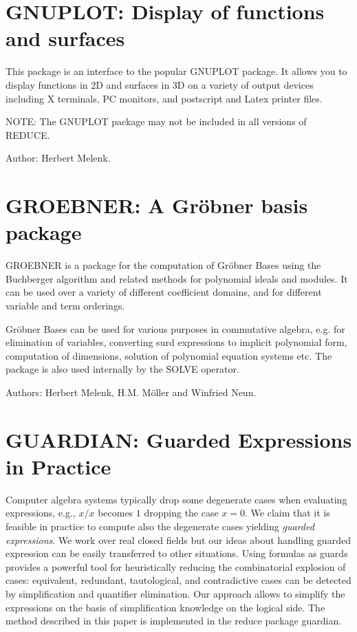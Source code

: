 \newpage

\section{GNUPLOT: Display of functions and surfaces}

This package is an interface to the popular GNUPLOT package.
It allows you to display functions in 2D and surfaces in 3D
on a variety of output devices including X terminals, PC monitors, and
postscript and Latex printer files.

NOTE: The GNUPLOT package may not be included in all versions of REDUCE.

Author: Herbert Melenk.


\newpage

\section{GROEBNER: A Gr\"obner basis package} 
\label{GROEBNER}

GROEBNER is a package for the computation of Gr\"obner
Bases using the Buchberger algorithm and related methods
for polynomial ideals and modules.  It can be used over a variety of
different coefficient domains, and for different variable and term
orderings.

Gr\"obner Bases can be used for various purposes in commutative
algebra, e.g. for elimination of variables,
converting surd expressions to implicit polynomial form,
computation of dimensions, solution of polynomial equation systems 
 etc. 
The package is also used internally by the \f{SOLVE}
operator.

Authors: Herbert Melenk, H.M. M\"oller and Winfried Neun.


\newpage

\section{GUARDIAN: Guarded Expressions in Practice}
\label{GUARDIAN}

Computer algebra systems typically drop some degenerate cases when
evaluating expressions, e.g., $x/x$ becomes $1$ dropping the case
$x=0$. We claim that it is feasible in practice to compute also the
degenerate cases yielding {\em guarded expressions}. We work over real
closed fields but our ideas about handling guarded expression can be
easily transferred to other situations. Using formulas as guards
provides a powerful tool for heuristically reducing the combinatorial
explosion of cases: equivalent, redundant, tautological, and
contradictive cases can be detected by simplification and quantifier
elimination. Our approach allows to simplify the expressions on the
basis of simplification knowledge on the logical side. The method
described in this paper is implemented in the {\sc reduce} package
{\sc guardian}.

